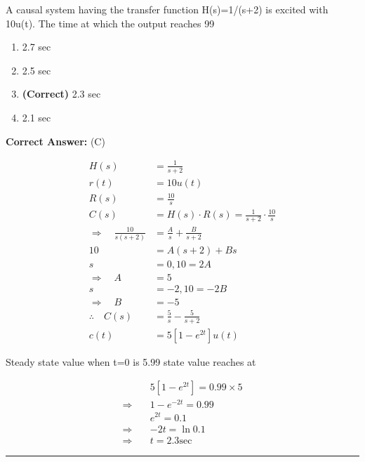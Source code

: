 \documentclass[11pt,a4paper]{article}
\begin{document}
\noindent A causal system having the transfer function H(s)=1/(s+2) is excited with
10u(t). The time at which the output reaches 99%


\begin{enumerate}[label=(\Alph*)]
    \item 2.7 sec
    \item 2.5 sec
    \item \textbf{(Correct)} 2.3 sec
    \item 2.1 sec
\end{enumerate}

\noindent \textbf{Correct Answer:} (C)

\begin{tcolorbox}[solbox, title=Detailed Solution -- Question 183]
\[
\begin{aligned} H(s) &=\frac{1}{s+2} \\ r(t) &=10 u(t) \\ R(s) &=\frac{10}{s} \\ C(s) &=H(s) \cdot R(s)=\frac{1}{s+2} \cdot \frac{10}{s} \\ \Rightarrow \quad \frac{10}{s(s+2)} &=\frac{A}{s}+\frac{B}{s+2} \\ 10 &=A(s+2)+B s \\ s &=0,10=2 A \\ \Rightarrow \quad A &=5 \\ s &=-2,10=-2 B \\ \Rightarrow \quad B &=-5 \\ \therefore \quad C(s) &=\frac{5}{s}-\frac{5}{s+2} \\ c(t) &=5\left[1-e^{2 t}\right] u(t) \end{aligned}
\]

 Steady state value when t=0 is 5.99%
 state value reaches at

\[
\begin{aligned} & 5\left[1-e^{2 t}\right]=0.99 \times 5 \\ \Rightarrow \quad & 1-e^{-2 t}=0.99 \\ & e^{2 t}=0.1 \\ \Rightarrow \quad &-2 t=\ln 0.1 \\ \Rightarrow \quad & t=2.3 \mathrm{sec} \end{aligned}
\]
\end{tcolorbox}

\vspace{1.5em}
\hrule
\vspace{1.5em}
\end{document}
